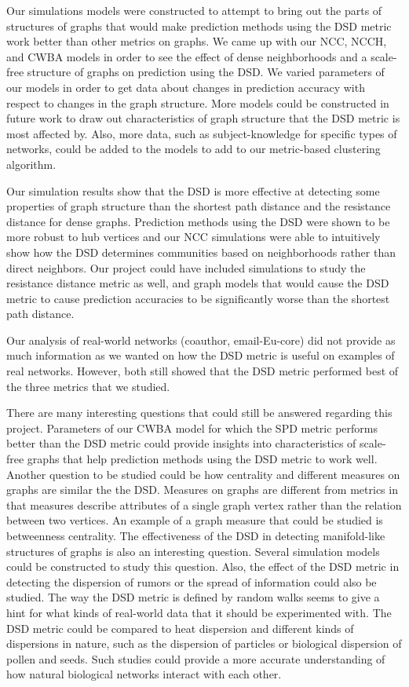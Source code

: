 Our simulations models were constructed to attempt to bring out the parts of 
structures of graphs that would make prediction methods using the DSD metric 
work better than other metrics on graphs. We came up with our NCC, NCCH, and
CWBA models in order to see the effect of dense neighborhoods and a scale-
free structure of graphs on prediction using the DSD. We varied parameters of 
our models in order to get data about changes in prediction accuracy with
respect to changes in the graph structure. More models could be constructed
in future work to draw out characteristics of graph structure that the DSD
metric is most affected by. Also, more data, such as subject-knowledge for
specific types of networks, could be added to the models to add to our
metric-based clustering algorithm.

Our simulation results show that the DSD is more effective at detecting some 
properties of graph structure than the shortest path distance and the
resistance distance for dense graphs. Prediction methods using the DSD were 
shown to be more robust to hub vertices and our NCC simulations were able to
intuitively show how the DSD determines communities based on neighborhoods 
rather than direct neighbors. Our project could have included simulations to
study the resistance distance metric as well, and graph models that would
cause the DSD metric to cause prediction accuracies to be significantly 
worse than the shortest path distance.

Our analysis of real-world networks (coauthor, email-Eu-core) did not provide
as much information as we wanted on how the DSD metric is useful on examples
of real networks. However, both still showed that the DSD metric performed
best of the three metrics that we studied.

There are many interesting questions that could still be answered regarding 
this project. Parameters of our CWBA model for which the SPD metric performs
better than the DSD metric could provide insights into characteristics of
scale-free graphs that help prediction methods using the DSD metric to work
well. Another question to be studied could be how centrality and different
measures on graphs are similar the the DSD. Measures on graphs are different
from metrics in that measures describe attributes of a single graph vertex
rather than the relation between two vertices. An example of a graph measure
that could be studied is betweenness centrality.
The effectiveness of the DSD in detecting manifold-like structures of
graphs is also an interesting question. Several simulation models could be
constructed to study this question. Also, the effect of the DSD metric in
detecting the dispersion of rumors or the spread of information could also
be studied. The way the DSD metric is defined by random walks seems to give
a hint for what kinds of real-world data that it should be experimented with.
The DSD metric could be compared to heat dispersion and different kinds
of dispersions in nature, such as the dispersion of particles or biological
dispersion of pollen and seeds. Such studies could provide a more accurate
understanding of how natural biological networks interact with each other.